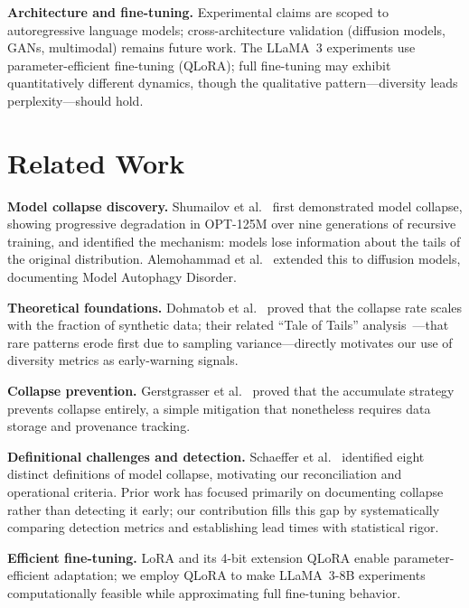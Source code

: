 \documentclass{svproc}
\begin{document}
\noindent\textbf{Architecture and fine-tuning.} Experimental claims are scoped to
autoregressive language models; cross-architecture validation (diffusion models,
GANs, multimodal) remains future work. The LLaMA~3 experiments use parameter-efficient
fine-tuning (QLoRA); full fine-tuning may exhibit quantitatively different dynamics,
though the qualitative pattern---diversity leads perplexity---should hold.

\section{Related Work}\label{sec:related}
\noindent\textbf{Model collapse discovery.} Shumailov et
al.~\cite{shumailov2024nature} first demonstrated model collapse, showing
progressive degradation in OPT-125M over nine generations of recursive training, and
identified the mechanism: models lose information about the tails of the original
distribution. Alemohammad et al.~\cite{alemohammad2024mad} extended this to
diffusion models, documenting Model Autophagy Disorder.

\noindent\textbf{Theoretical foundations.} Dohmatob et
al.~\cite{dohmatob2025strong} proved that the collapse rate scales with the fraction
of synthetic data; their related ``Tale of Tails''
analysis~\cite{dohmatob2024tale}---that rare patterns erode first due to sampling
variance---directly motivates our use of diversity metrics as early-warning signals.

\noindent\textbf{Collapse prevention.} Gerstgrasser et
al.~\cite{gerstgrasser2024inevitable} proved that the accumulate strategy prevents
collapse entirely, a simple mitigation that nonetheless requires data storage and
provenance tracking.

\noindent\textbf{Definitional challenges and detection.} Schaeffer et
al.~\cite{schaeffer2025position} identified eight distinct definitions of model
collapse, motivating our reconciliation and operational criteria. Prior work has
focused primarily on documenting collapse rather than detecting it early; our
contribution fills this gap by systematically comparing detection metrics and
establishing lead times with statistical rigor.

\noindent\textbf{Efficient fine-tuning.} LoRA and its 4-bit extension QLoRA
\cite{dettmers2023qlora} enable parameter-efficient adaptation; we employ QLoRA to
make LLaMA~3-8B experiments computationally feasible while approximating full
fine-tuning behavior.
\end{document}
